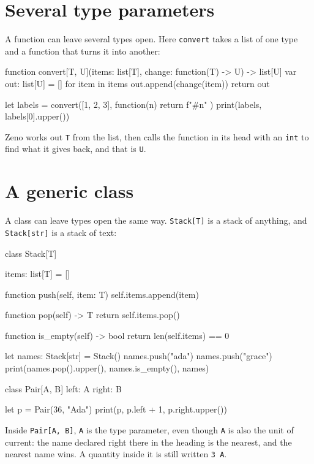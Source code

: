 \section{Several type parameters}

A function can leave several types open. Here \verb|convert| takes a
list of one type and a function that turns it into another:

\begin{zeno}
function convert[T, U](items: list[T], change: function(T) -> U) -> list[U] {
    var out: list[U] = []
    for item in items {
        out.append(change(item))
    }
    return out
}

let labels = convert([1, 2, 3], function(n) { return f"#{n}" })
print(labels, labels[0].upper())
\end{zeno}

Zeno works out \verb|T| from the list, then calls the function in its
head with an \verb|int| to find what it gives back, and that is
\verb|U|.

\section{A generic class}

A class can leave types open the same way. \verb|Stack[T]| is a stack
of anything, and \verb|Stack[str]| is a stack of text:

\begin{zeno}
class Stack[T] {
    items: list[T] = []

    function push(self, item: T) {
        self.items.append(item)
    }

    function pop(self) -> T {
        return self.items.pop()
    }

    function is_empty(self) -> bool {
        return len(self.items) == 0
    }
}

let names: Stack[str] = Stack()
names.push("ada")
names.push("grace")
print(names.pop().upper(), names.is_empty(), names)
\end{zeno}

\begin{zeno}
class Pair[A, B] {
    left: A
    right: B
}

let p = Pair(36, "Ada")
print(p, p.left + 1, p.right.upper())
\end{zeno}

Inside \verb|Pair[A, B]|, \verb|A| is the type parameter, even though
\verb|A| is also the unit of current: the name declared right there in
the heading is the nearest, and the nearest name wins. A quantity
inside it is still written \verb|3 A|.

